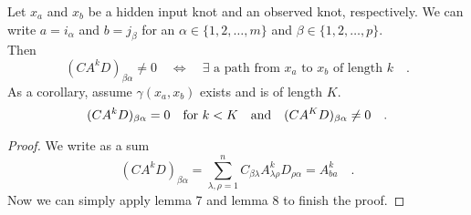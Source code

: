 \begin{proposition}{}{}
	Let $x_a$ and $x_b$ be a hidden input knot and an observed knot, respectively. We can 
	write $a=i_\alpha$ and $b=j_\beta$ for an $\alpha\in\{1,2,\ldots,m\}$ and 
	$\beta\in\{1,2,\ldots,p\}$.\\
	Then
	\begin{equation}
	(CA^kD)_{\beta\alpha} \neq 0 \quad \Leftrightarrow \quad \exists \text{ a path from }
	x_a \text{ to } x_b \text{ of length }k \quad . 
\end{equation}		
	As a corollary, assume $\gamma(x_a,x_b)$ exists and is of length $K$.
	\begin{equation}
	(CA^kD)_{\beta\alpha} = 0 \quad \text{for }k<K \quad \text{and} \quad (CA^KD)_{\beta\alpha}\neq 0 
	\quad .
	\end{equation}
	
\end{proposition}
\begin{proof}
	We write as a sum
	\begin{equation}
	(CA^k D)_{\beta\alpha} = \sum\limits_{\lambda,\rho=1}^n C_{\beta \lambda} A^k_{\lambda
	\rho} D_{\rho \alpha} = A^k_{ba} \quad .
	\end{equation}
	Now we can simply apply lemma 7 and lemma 8 to finish the proof.
\end{proof}

